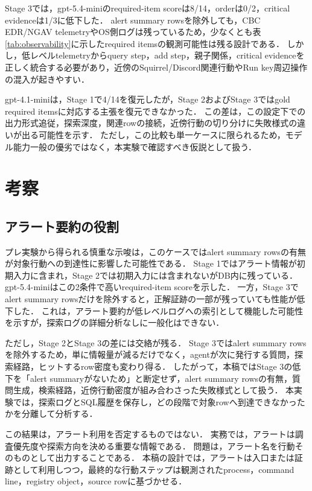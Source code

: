 \documentclass[a4paper,twocolumn,10pt]{ltjsarticle}
\begin{document}
Stage 3では，gpt-5.4-miniのrequired-item scoreは8/14，orderは0/2，critical evidenceは1/3に低下した．
alert summary rowsを除外しても，CBC EDR/NGAV telemetryやOS側ログは残っているため，少なくとも表\ref{tab:observability}に示したrequired itemsの観測可能性は残る設計である．
しかし，低レベルtelemetryからquery step，add step，親子関係，critical evidenceを正しく統合する必要があり，近傍のSquirrel/Discord関連行動やRun key周辺操作の混入が起きやすい．

gpt-4.1-miniは，Stage 1で4/14を復元したが，Stage 2およびStage 3ではgold required itemsに対応する主張を復元できなかった．
この差は，この設定下での出力形式追従，探索深度，関連rowの接続，近傍行動の切り分けに失敗様式の違いが出る可能性を示す．
ただし，この比較も単一ケースに限られるため，モデル能力一般の優劣ではなく，本実験で確認すべき仮説として扱う．

\section{考察}

\subsection{アラート要約の役割}

プレ実験から得られる慎重な示唆は，このケースではalert summary rowsの有無が対象行動への到達性に影響した可能性である．
Stage 1ではアラート情報が初期入力に含まれ，Stage 2では初期入力には含まれないがDB内に残っている．
gpt-5.4-miniはこの2条件で高いrequired-item scoreを示した．
一方，Stage 3でalert summary rowsだけを除外すると，正解証跡の一部が残っていても性能が低下した．
これは，アラート要約が低レベルログへの索引として機能した可能性を示すが，探索ログの詳細分析なしに一般化はできない．

ただし，Stage 2とStage 3の差には交絡が残る．
Stage 3ではalert summary rowsを除外するため，単に情報量が減るだけでなく，agentが次に発行する質問，探索経路，ヒットするrow密度も変わり得る．
したがって，本稿ではStage 3の低下を「alert summaryがないため」と断定せず，alert summary rowsの有無，質問生成，検索経路，近傍行動密度が組み合わさった失敗様式として扱う．
本実験では，探索ログとSQL履歴を保存し，どの段階で対象rowへ到達できなかったかを分離して分析する．

この結果は，アラート利用を否定するものではない．
実務では，アラートは調査優先度や探索方向を決める重要な情報である．
問題は，アラート名を行動そのものとして出力することである．
本稿の設計では，アラートは入口または証跡として利用しつつ，最終的な行動ステップは観測されたprocess，command line，registry object，source rowに基づかせる．
\end{document}
